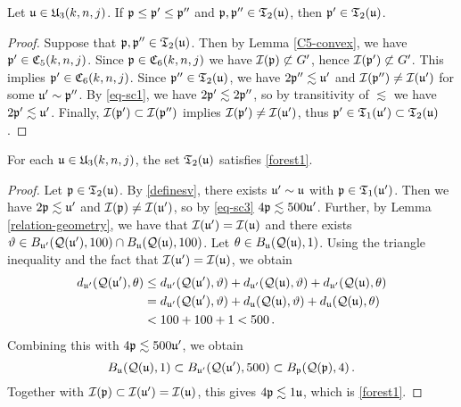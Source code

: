 {\begin{lemma}[C6 convex]
    \label{C6-convex}
    Let $\fu \in \fU_3(k,n,j)$. If $\fp \le \fp' \le \fp''$ and $\fp, \fp'' \in \mathfrak{T}_2(\fu)$, then $\fp' \in \mathfrak{T}_2(\fu)$.
\end{lemma}

\begin{proof}
    Suppose that $\fp, \fp'' \in \mathfrak{T}_2(\fu)$. Then by Lemma \ref{C5-convex}, we have
$\fp' \in \fC_5(k,n,j)$. Since $\fp \in \fC_6(k,n,j)$ we have $\sc(\fp) \not\subset G'$, hence $\sc(\fp') \not \subset G'$. This implies $\fp' \in \fC_6(k,n,j)$. Since $\fp'' \in \mathfrak{T}_2(\fu)$, we have $2\fp'' \lesssim \fu'$ and $\sc(\fp'')\ne\sc(\fu')$ for some $\fu' \sim \fp''$. By \eqref{eq-sc1}, we have $2\fp' \lesssim 2\fp''$, so by transitivity of $\lesssim$ we have $2\fp' \lesssim \fu'$. Finally, $\sc(\fp') \subset \sc(\fp'')$ implies $\sc(\fp') \ne \sc(\fu')$, thus $\fp' \in \mathfrak{T}_1(\fu') \subset \mathfrak{T}_2(\fu)$.
\end{proof}


\begin{lemma}
    \label{forest-geometry}
    For each $\fu\in \fU_3(k,n,j)$,
    the set $\mathfrak{T}_2(\fu)$
    satisfies \eqref{forest1}.
\end{lemma}
\begin{proof}
    Let $\fp \in \mathfrak{T}_2(\fu)$. By \eqref{definesv}, there exists $\fu' \sim \fu$ with $\fp \in \mathfrak{T}_1(\fu')$. Then we have $2\fp \lesssim \fu'$ and $\sc(\fp) \ne \sc(\fu')$, so by \eqref{eq-sc3} $4\fp \lesssim 500\fu'$.
    Further, by Lemma \ref{relation-geometry}, we have that $\sc(\fu') = \sc(\fu)$ and there exists $\mfa \in B_{\fu'}(\fcc(\fu'),100) \cap B_{\fu}(\fcc(\fu),100)$.
    Let $\mfb \in B_{\fu}(\fcc(\fu), 1)$.
    Using the triangle inequality and the fact that $\sc(\fu')  =\sc(\fu)$, we obtain
    \begin{align*}
        d_{\fu'}(\fcc(\fu'), \mfb) &\le d_{\fu'}(\fcc(\fu'), \mfa) + d_{\fu'}(\fcc(\fu), \mfa) + d_{\fu'}(\fcc(\fu), \mfb)\\
        &= d_{\fu'}(\fcc(\fu'), \mfa) + d_{\fu}(\fcc(\fu), \mfa) + d_{\fu}(\fcc(\fu), \mfb)\\
        &< 100 + 100 + 1 < 500\,.
    \end{align*}
    Combining this with $4\fp \lesssim 500\fu'$, we obtain
    $$
        B_{\fu}(\fcc(\fu), 1) \subset B_{\fu'}(\fcc(\fu'), 500) \subset B_{\fp}(\fcc(\fp), 4)\,.
    $$
    Together with $\sc(\fp) \subset \sc(\fu') = \sc(\fu)$, this gives $4\fp \lesssim 1\fu$, which is \eqref{forest1}.
\end{proof}

}
